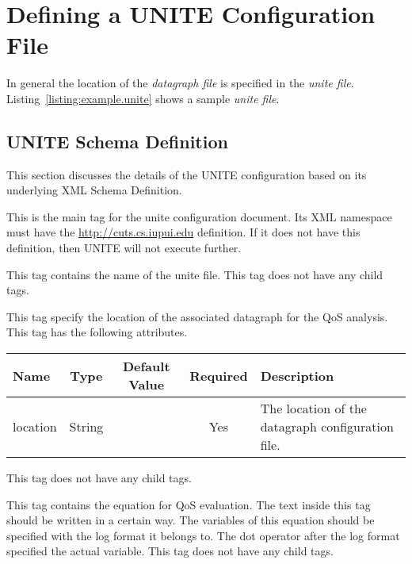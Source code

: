 \section{Defining a UNITE Configuration File}

In general the location of the \textit{datagraph file} is specified in the 
\textit{unite file}. Listing~\ref{listing:example.unite} shows a sample 
\textit{unite file}. 



\subsection{UNITE Schema Definition}
\label{sec:unite-scema}

This section discusses the details of the UNITE configuration 
based on its underlying XML Schema Definition.

This is the main tag for the unite configuration document. Its 
XML namespace must have the \url{http://cuts.cs.iupui.edu} definition. If it does
not have this definition, then UNITE will not execute further.


This tag contains the name of the unite file. This tag does not have 
any child tags.


This tag specify the location of the associated datagraph for the 
QoS analysis. This tag has the following attributes.

\begin{table}[h]
  \begin{tabular}{lcccl}
  \hline
  \textbf{Name} & \textbf{Type} & \textbf{Default Value} & \textbf{Required} & \textbf{Description} \\
  \hline
  location & String  & & Yes & The location of the datagraph configuration file. \\
  \end{tabular}
\end{table}

This tag does not have any child tags.


This tag contains the equation for QoS evaluation. The text inside 
this tag should be written in a certain way. The variables of this 
equation should be specified with the log format it belongs to. The 
dot operator after the log format specified the actual variable. This tag 
does not have any child tags.

